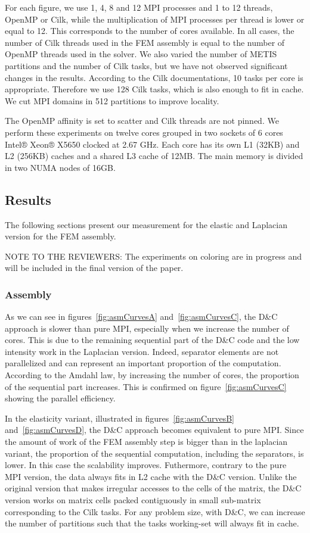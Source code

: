 \documentclass{IOS-Book-Article}
\begin{document}
For each figure, we use 1, 4, 8 and 12 MPI processes and 1 to 12 threads, OpenMP or Cilk, while the multiplication of MPI processes per thread is lower or equal to 12.
This corresponds to the number of cores available. In all cases, the number of Cilk threads used in the FEM assembly is equal to the number of OpenMP threads used in the solver.
We also varied the number of METIS partitions and the number of Cilk tasks, but we have not observed significant changes in the results.
According to the Cilk documentations, 10 tasks per core is appropriate. Therefore we use 128 Cilk tasks, which is also enough to fit in cache.
We cut MPI domains in 512 partitions to improve locality.

The OpenMP affinity is set to scatter and Cilk threads are not pinned.
We perform these experiments on twelve cores grouped in two sockets of 6 cores Intel® Xeon® X5650 clocked at 2.67 GHz.
Each core has its own L1 (32KB) and L2 (256KB) caches and a shared L3 cache of 12MB. The main memory is divided in two NUMA nodes of 16GB.

\subsection{Results}
The following sections present our measurement for the elastic and Laplacian version for the FEM assembly. 

NOTE TO THE REVIEWERS: The experiments on coloring are in progress and will be included in the final version of the paper.

\subsubsection{Assembly}
As we can see in figures~\ref{fig:asmCurvesA} and~\ref{fig:asmCurvesC}, the D\&C approach is slower than pure MPI, especially when we increase the number of cores.
This is due to the remaining sequential part of the D\&C code and the low intensity work in the Laplacian version.
Indeed, separator elements are not parallelized and can represent an important proportion of the computation.
According to the Amdahl law, by increasing the number of cores, the proportion of the sequential part increases. This is confirmed on figure~\ref{fig:asmCurvesC} showing the parallel efficiency.

In the elasticity variant, illustrated in figures~\ref{fig:asmCurvesB} and~\ref{fig:asmCurvesD}, the D\&C approach becomes equivalent to pure MPI.
Since the amount of work of the FEM assembly step is bigger than in the laplacian variant, the proportion of the sequential computation, including the separators, is lower.
In this case the scalability improves. Futhermore, contrary to the pure MPI version, the data always fits in L2 cache with the D\&C version.
Unlike the original version that makes irregular accesses to the cells of the matrix, the D\&C version works on matrix cells packed contiguously in small sub-matrix corresponding to the Cilk tasks.
For any problem size, with D\&C, we can increase the number of partitions such that the tasks working-set will always fit in cache.
\end{document}
